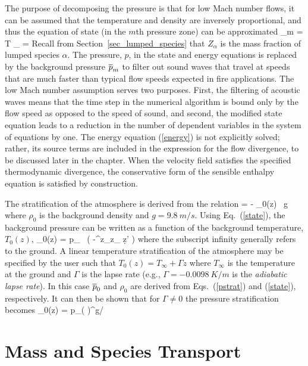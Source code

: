 The purpose of decomposing the pressure is that for low Mach number flows, it can be assumed that the temperature and density are inversely
proportional, and thus the equation of state (in the $m$th pressure zone) can be approximated
\be \bp_m  =  \rho T \R \sum_\alpha {} =   \label{state} \ee
Recall from Section~\ref{sec_lumped_species} that $Z_\alpha$ is the mass fraction of lumped species $\alpha$.
The pressure, $p$, in the state and energy equations is replaced by the background pressure $\overline{p}_m$ to filter out sound waves
that travel at speeds that are much faster
than typical flow speeds expected in fire applications. The low Mach number assumption serves two purposes. First, the filtering of acoustic waves
means that the time step in the numerical algorithm is bound only by the flow speed as opposed to the speed of sound, and second, the modified state
equation leads to a reduction in the number of dependent variables in the system of equations by one. The energy equation (\ref{energy}) is not
explicitly solved; rather, its source terms are included in the expression for the flow divergence, to be discussed later in the chapter.  When the velocity field satisfies the specified thermodynamic divergence, the conservative form of the sensible enthalpy equation is satisfied by construction.

The stratification of the atmosphere is derived from the relation
\be {} = - \rho_0(z) \, g  \ee
where $\rho_0$ is the background density and $g=\SI{9.8}{m/s}$. Using Eq.~(\ref{state}), the background pressure can be written as a function of the background temperature, $T_0(z)$,
\be \bp_0(z) = p_\infty \; \exp \, \left( -\int^z_{z_\infty}  \d z' \right)  \label{pstrat} \ee
where the subscript infinity generally refers to the ground. A linear temperature stratification of the atmosphere may be
specified by the user such that $T_0(z) = T_\infty + \Gamma z$ where $T_\infty$ is the temperature at the ground and
$\Gamma$ is the lapse rate (e.g., $\Gamma = -\SI{0.0098}{K/m}$ is the {\em adiabatic lapse rate}).
In this case $\overline{p}_0$ and $\rho_0$ are derived from Eqs.~(\ref{pstrat}) and (\ref{state}), respectively.
It can then be shown that for $\Gamma \ne 0$ the pressure stratification becomes
\be
   \bp_0(z) = p_\infty  \left(  \right)^{g/\R \Gamma}
   \label{pstrat2}
\ee


\section{Mass and Species Transport}

